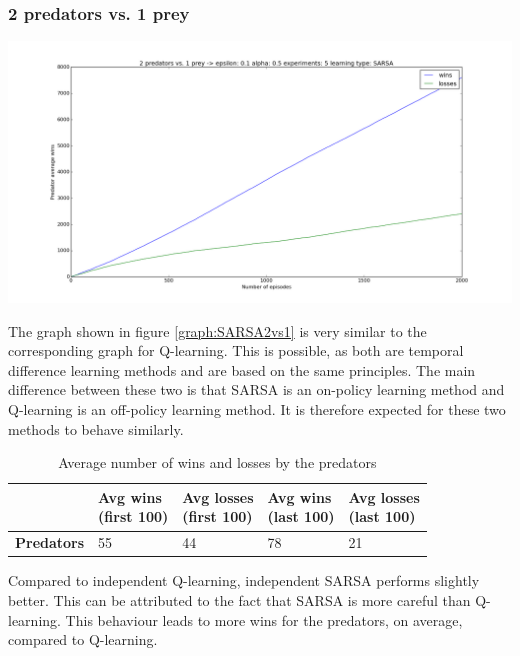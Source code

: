 \subsubsection{2 predators vs. 1 prey}
\begin{center}
	\includegraphics[scale=0.3]{2_predators_SARSA}
	\label{graph:SARSA2vs1}
\end{center}

The graph shown in figure \ref{graph:SARSA2vs1} is very similar to the corresponding graph for Q-learning. This is possible, as both are temporal difference learning methods and are based on the same principles. The main difference between these two is that SARSA is an on-policy learning method and Q-learning is an off-policy learning method. It is therefore expected for these two methods to behave similarly.

\begin{table}[H]
\begin{center}
\begin{tabular}{| l | l | l | l | l |}
\hline
 & \parbox{2cm}{\textbf{Avg wins \\ (first 100)}} & \parbox{2cm}{\textbf{Avg losses \\ (first 100)}} & \parbox{2cm}{\textbf{Avg wins \\ (last 100)}} & \parbox{2cm}{\textbf{Avg losses \\ (last 100)}} \\
\hline
\textbf{Predators} & 55 & 44 & 78 & 21 \\
\hline
\end{tabular}
\caption{Average number of wins and losses by the predators}
\end{center}
\end{table}

Compared to independent Q-learning, independent SARSA performs slightly better. This can be attributed to the fact that SARSA is more careful than Q-learning. This behaviour leads to more wins for the predators, on average, compared to Q-learning.

